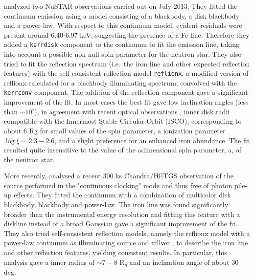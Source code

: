 \documentclass{aa}
\begin{document}
\citet{Miller.etal:13} analyzed two NuSTAR observations 
carried out on July 2013. %
They fitted the continuum emission using a model consisting of 
a blackbody, a disk blackbody and a power-law. With respect to this 
continuum model, evident residuals were present around 
6.40-6.97 keV, suggesting the presence of a Fe line. Therefore they 
added a \texttt{kerrdisk} component to the continuum to fit the emission
line, taking into account a possible non-null spin parameter for the neutron
star. 
They also tried to fit the reflection spectrum (i.e.\ the iron line and 
other expected reflection features) with the self-consistent reflection 
model \texttt{reflionx}, a modified version of reflionx calculated for a 
blackbody illuminating spectrum, convolved with the \texttt{kerrconv} component.
The addition of the reflection component gave a significant improvement
of the fit. In most cases the best fit gave low inclination angles 
(less than $\sim 10^\circ$), in agreement with recent optical observations
\citep{Cornelisse.etal:13}, inner disk radii compatible with the Innermost 
Stable Circular Orbit (ISCO), corresponding to about 6 Rg for small values 
of the spin parameter, a ionization parameter $\log \xi \sim 2.3-2.6$, 
and a slight preference for an enhanced iron abundance.
The fit resulted quite insensitive to the value of the adimensional 
spin parameter, a, of the neutron star.

More recently, \citet{Chiang.etal:16} analysed a recent 300 ks Chandra/HETGS 
observation of the source performed in the "continuous clocking" mode and thus 
free of photon pile-up effects. They fitted the continuum with a combination
of multicolor disk blackbody, blackbody and power-law. The iron line was found
significantly broader than the instrumental energy resolution and fitting 
this feature with a diskline instead of a broad Gaussian gave a significant
improvement of the fit. They also tried self-consistent reflection models,
namely the reflionx model with a power-law continuum as illuminating source
and xillver \citep[see e.g.][]{Garcia.etal:13},
to describe the iron line and other reflection features, yielding consistent
results. In particular, this analysis gave a inner radius of $\sim 7-8$ R$_g$ 
and an inclination angle of about 30 deg.
\end{document}

